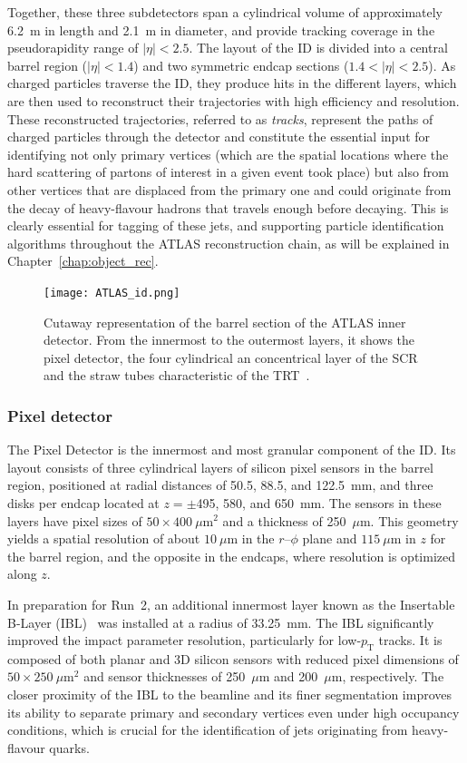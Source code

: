 Together, these three subdetectors span a cylindrical volume of approximately 6.2~m in length and 2.1~m in diameter, and provide tracking coverage in the pseudorapidity range of $|\eta| < 2.5$. The layout of the ID is divided into a central barrel region ($|\eta| < 1.4$) and two symmetric endcap sections ($1.4 < |\eta| < 2.5$). As charged particles traverse the ID, they produce hits in the different layers, which are then used to reconstruct their trajectories with high efficiency and resolution. 
These reconstructed trajectories, referred to as \textit{tracks}, represent the paths of charged particles through the detector and constitute the essential input for identifying not only primary vertices (which are the spatial locations where the hard scattering of partons of interest in a given event took place) but also from other vertices that are displaced from the primary one and could originate from the decay of heavy-flavour hadrons that travels enough before decaying. This is clearly essential for tagging of these jets, and supporting particle identification algorithms throughout the ATLAS reconstruction chain, as will be explained in Chapter~\ref{chap:object_rec}.
\begin{figure}[htbp]
    \centering
        \texttt{[image: ATLAS\_id.png]}
    \caption{Cutaway representation of the barrel section of the ATLAS inner detector. From the innermost to the outermost layers, it shows the pixel detector, the four cylindrical an concentrical layer of the SCR and the straw tubes characteristic of the TRT~\cite{Collaboration:2723878}.}
    \label{fig:id}
\end{figure}

\subsubsection*{Pixel detector}

The Pixel Detector is the innermost and most granular component of the ID. Its layout consists of three cylindrical layers of silicon pixel sensors in the barrel region, positioned at radial distances of 50.5, 88.5, and 122.5~mm, and three disks per endcap located at $z = \pm$495, 580, and 650~mm. The sensors in these layers have pixel sizes of $50 \times 400~\mu\text{m}^2$ and a thickness of 250~$\mu$m. This geometry yields a spatial resolution of about $10~\mu$m in the $r\text{--}\phi$ plane and $115~\mu$m in $z$ for the barrel region, and the opposite in the endcaps, where resolution is optimized along $z$.

In preparation for Run~2, an additional innermost layer known as the Insertable B-Layer (IBL)~\cite{IBL} was installed at a radius of 33.25~mm. The IBL significantly improved the impact parameter resolution, particularly for low-$p_{\mathrm{T}}$ tracks. It is composed of both planar and 3D silicon sensors with reduced pixel dimensions of $50 \times 250~\mu\text{m}^2$ and sensor thicknesses of 250~$\mu$m and 200~$\mu$m, respectively. The closer proximity of the IBL to the beamline and its finer segmentation improves its ability to separate primary and secondary vertices even under high occupancy conditions, which is crucial for the identification of jets originating from heavy-flavour quarks.


